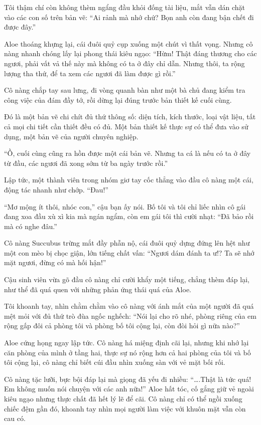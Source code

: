 \documentclass[../main.tex]{subfiles}
\begin{document}
Tôi thậm chí còn không thèm ngẩng đầu khỏi đống tài liệu, mắt vẫn dán chặt vào các con số trên bản vẽ: ``Ai rảnh mà nhớ chứ? Bọn anh còn đang bận chết đi được đây.''

Aloe thoáng khựng lại, cái đuôi quỷ cụp xuống một chút vì thất vọng. Nhưng cô nàng nhanh chóng lấy lại phong thái kiêu ngạo: ``Hừm! Thật đáng thương cho các ngươi, phải vất vả thế này mà không có ta ở đây chỉ dẫn. Nhưng thôi, ta rộng lượng tha thứ, để ta xem các ngươi đã làm được gì rồi.''

Cô nàng chắp tay sau lưng, đi vòng quanh bàn như một bà chủ đang kiểm tra công việc của đám đầy tớ, rồi dừng lại đúng trước bản thiết kế cuối cùng.

Đó là một bản vẽ chi chít đủ thứ thông số: diện tích, kích thước, loại vật liệu, tất cả mọi chi tiết cần thiết đều có đủ. Một bản thiết kế thực sự có thể đưa vào sử dụng, một bản vẽ của người chuyên nghiệp.

``Ồ, cuối cùng cũng ra hồn được một cái bản vẽ. Nhưng ta cá là nếu có ta ở đây từ đầu, các ngươi đã xong sớm từ ba ngày trước rồi.''

Lập tức, một thành viên trong nhóm giơ tay cốc thẳng vào đầu cô nàng một cái, động tác nhanh như chớp. ``Đau!''

``Mơ mộng ít thôi, nhóc con,'' cậu bạn ấy nói. Bố tôi và tôi chỉ liếc nhìn cô gái đang xoa đầu xù xì kia mà ngán ngẩm, còn em gái tôi thì cười nhạt: ``Đã bảo rồi mà có nghe đâu.''

Cô nàng Succubus trừng mắt đầy phẫn nộ, cái đuôi quỷ dựng đứng lên hệt như một con mèo bị chọc giận, lớn tiếng chất vấn: ``Ngươi dám đánh ta ư!? Ta sẽ nhớ mặt ngươi, đừng có mà hối hận!''

Cậu sinh viên vừa gõ đầu cô nàng chỉ cười khẩy một tiếng, chẳng thèm đáp lại, như thể đã quá quen với những phản ứng thái quá của Aloe.

Tôi khoanh tay, nhìn chằm chằm vào cô nàng với ánh mắt của một người đã quá mệt mỏi với đủ thứ trò đùa ngốc nghếch: ``Nói lại cho rõ nhé, phòng riêng của em rộng gấp đôi cả phòng tôi và phòng bố tôi cộng lại, còn đòi hỏi gì nữa nào?''

Aloe cứng họng ngay lập tức. Cô nàng há miệng định cãi lại, nhưng khi nhớ lại căn phòng của mình ở tầng hai, thực sự nó rộng hơn cả hai phòng của tôi và bố tôi cộng lại, cô nàng chỉ biết cúi đầu nhìn xuống sàn với vẻ mặt bối rối.

Cô nàng tặc lưỡi, bực bội đáp lại mà giọng đã yếu đi nhiều: ``\dots .Thật là tức quá! Em không muốn nói chuyện với các anh nữa!'' Aloe hất tóc, cố gắng giữ vẻ ngoài kiêu ngạo nhưng thực chất đã hết lý lẽ để cãi. Cô nàng chỉ có thể ngồi xuống chiếc đệm gần đó, khoanh tay nhìn mọi người làm việc với khuôn mặt vẫn còn cau có.
\end{document}
